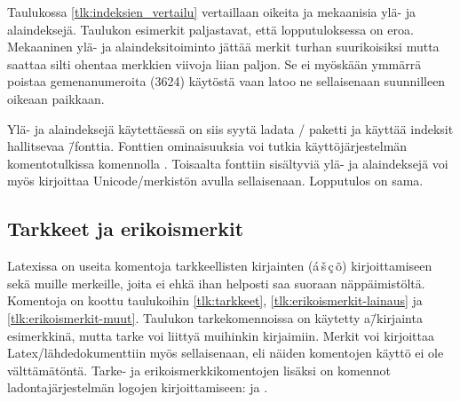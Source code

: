 
Taulukossa \ref{tlk:indeksien_vertailu} vertaillaan oikeita ja
mekaanisia ylä- ja alaindeksejä. Taulukon esimerkit paljastavat, että
lopputuloksessa on eroa. Mekaaninen ylä- ja alaindeksitoiminto jättää
merkit turhan suurikoisiksi mutta saattaa silti ohentaa merkkien viivoja
liian paljon. Se ei myöskään ymmärrä poistaa gemenanumeroita (3624)
käytöstä vaan latoo ne sellaisenaan suunnilleen oikeaan paikkaan.

Ylä- ja alaindeksejä käytettäessä on siis syytä ladata
\-/ paketti ja käyttää indeksit hallitsevaa
 \=/fonttia. Fonttien ominaisuuksia voi tutkia
käyttöjärjestelmän komentotulkissa komennolla .
Toisaalta fonttiin sisältyviä ylä- ja alaindeksejä voi myös kirjoittaa
Unicode\-/merkistön avulla sellaisenaan. Lopputulos on sama.

\subsection{Tarkkeet ja erikoismerkit}
\label{luku:tarkkeet}

Latexissa on useita komentoja tarkkeellisten kirjainten
(\'a\,\v{s}\,\c{c}\,\~o) kirjoittamiseen sekä muille merkeille, joita ei
ehkä ihan helposti saa suoraan näppäimistöltä. Komentoja on koottu
taulukoihin \ref{tlk:tarkkeet}, \ref{tlk:erikoismerkit-lainaus} ja
\ref{tlk:erikoismerkit-muut}. Taulukon tarkekomennoissa on käytetty
a\=/kirjainta esimerkkinä, mutta tarke voi liittyä muihinkin kirjaimiin.
\marginaali{\TeX} \marginaali{\LaTeX} Merkit voi kirjoittaa
Latex\-/lähdedokumenttiin myös sellaisenaan, eli näiden komentojen
käyttö ei ole välttämätöntä. Tarke- ja erikoismerkkikomentojen lisäksi
on komennot ladontajärjestelmän logojen kirjoittamiseen: 
ja .

